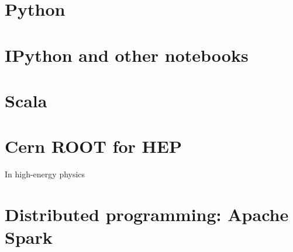 \begin{refsection}
\section{Python}   

\section{IPython  and other notebooks}   
\section{Scala}

\section{Cern ROOT for HEP}
In high-energy physics

\section{Distributed programming: Apache Spark}


\printbibliography[heading=subbibliography]
\end{refsection}

